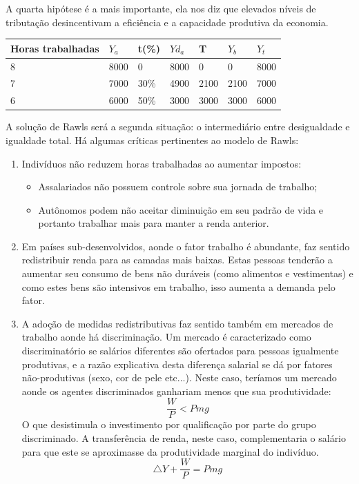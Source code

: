 \documentclass[12pt,a4paper,oneside,brazil]{abntex2}
\begin{document}
A quarta hipótese é a mais importante, ela nos diz que elevados níveis de tributação desincentivam a eficiência e a capacidade produtiva da economia.

\begin{table}[h]
\centering
\begin{tabular}{|l|l|l|l|l|l|l|}
\hline
Horas trabalhadas & $Y_a$ & t(\%) & $Yd_a$ & T    & $Y_b$ & $Y_t$ \\ \hline
8                 & 8000  & 0     & 8000   & 0    & 0     & 8000  \\ \hline
7                 & 7000  & 30\%  & 4900   & 2100 & 2100  & 7000  \\ \hline
6                 & 6000  & 50\%  & 3000   & 3000 & 3000  & 6000  \\ \hline
\end{tabular}
\end{table}
A solução de Rawls será a segunda situação: o intermediário entre desigualdade e igualdade total. Há algumas críticas pertinentes ao modelo de Rawls:
\begin{enumerate}
\item Indivíduos não reduzem horas trabalhadas ao aumentar impostos:
\begin{itemize}
\item Assalariados não possuem controle sobre sua jornada de trabalho;
\item Autônomos podem não aceitar diminuição em seu padrão de vida e portanto trabalhar mais para manter a renda anterior.
\end{itemize}
\item Em países sub-desenvolvidos, aonde o fator trabalho é abundante, faz sentido redistribuir renda para as camadas mais baixas. Estas pessoas tenderão a aumentar seu consumo de bens não duráveis (como alimentos e vestimentas) e como estes bens são intensivos em trabalho, isso aumenta a demanda pelo fator.
\item A adoção de medidas redistributivas faz sentido também em mercados de trabalho aonde há discriminação. Um mercado é caracterizado como discriminatório se salários diferentes são ofertados para pessoas igualmente produtivas, e a razão explicativa desta diferença salarial se dá por fatores não-produtivas (sexo, cor de pele etc...). Neste caso, teríamos um mercado aonde os agentes discriminados ganhariam menos que sua produtividade:
\[ \frac{W}{P} < Pmg \]
O que desistimula o investimento por qualificação por parte do grupo discriminado. A transferência de renda, neste caso, complementaria o salário para que este se aproximasse da produtividade marginal do indivíduo.
\[ \triangle Y + \frac{W}{P} = Pmg \]
\end{enumerate}
\end{document}
